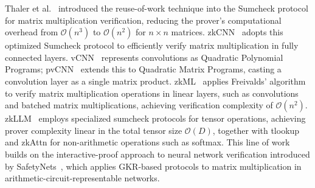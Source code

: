 \documentclass[sigconf,anonymous,review,balance=false]{acmart}
\newcommand{\rev}[1]{{\color{magenta}#1}}
\begin{document}
Thaler et al.~\cite{Thaler} introduced the reuse-of-work technique into the Sumcheck protocol for matrix multiplication verification, \rev{reducing the prover’s computational overhead from $\mathcal{O}(n^3)$ to $\mathcal{O}(n^2)$ for $n \times n$ matrices}. zkCNN~\cite{zkCNN} adopts this optimized Sumcheck protocol to efficiently verify matrix multiplication in fully connected layers.
\rev{vCNN~\cite{vCNN} represents convolutions as Quadratic Polynomial Programs; pvCNN~\cite{pvCNN} extends this to Quadratic Matrix Programs, casting a convolution layer as a single matrix product.}
zkML~\cite{zkML} applies Freivalds’ algorithm~\cite{Freivalds} to verify matrix multiplication operations in linear layers, such as convolutions and batched matrix multiplications, \rev{achieving verification complexity of $\mathcal{O}(n^2)$.}
zkLLM~\cite{zkLLM} employs specialized sumcheck protocols for tensor operations, \rev{achieving prover complexity linear in the total tensor size $\mathcal{O}(D)$}, together with tlookup and zkAttn for non-arithmetic operations such as softmax. This line of work builds on the interactive-proof approach to neural network verification introduced by SafetyNets~\cite{SafetyNets}, which applies GKR-based protocols to matrix multiplication in arithmetic-circuit-representable networks. 
\end{document}
